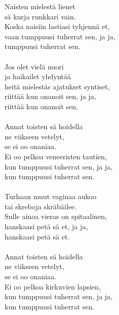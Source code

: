 
            Naisten mielestä lienet  \\
            sä kurja runkkari vain.  \\
            Koska naisiin lastiasi tyhjennä et,  \\
            vaan tumppuusi tuherrat sen, ja ja,  \\
            tumppuusi tuherrat sen. \\
\hspace{10mm} \\
            Jos olet vielä nuori  \\
            ja haikailet yhdyntää  \\
            heitä mielestäs ajatukset syntiset,  \\
            riittää kun onanoit sen, ja ja,  \\
            riittää kun onanoit sen. \\
\hspace{10mm} \\
            Annat toisten sä hoidella  \\
            ne viikseen vetelyt,  \\
            se ei oo onaniaa.  \\
            Ei oo pelkoa veneeristen tautien,  \\
            kun tumppuusi tuherrat sen, ja ja,  \\
            kun tumppuusi tuherrat sen. \\
\hspace{10mm} \\
            Turhaan muut vaginaa aukoo  \\
            tai skreboja skräbäilee.  \\
            Sulle ainoa vieras on spitaalinen,  \\
            hanskaasi petä sä et, ja ja,  \\
            hanskaasi petä sä et. \\
\hspace{10mm} \\
            Annat toisten sä hoidella  \\
            ne viikseen vetelyt,  \\
            se ei oo onaniaa.  \\
            Ei oo pelkoa kirkuvien lapsien,  \\
            kun tumppuusi tuherrat sen, ja ja,  \\
            kun tumppuusi tuherrat sen. \\

